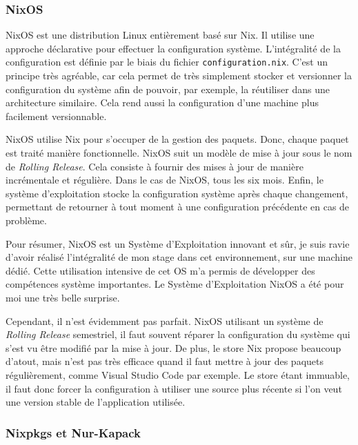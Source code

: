 \documentclass[a4paper,french,12pt, titlepage]{article}
\begin{document}
\hypertarget{nixos}{%
\subsubsection{NixOS}\label{nixos}}

NixOS est une distribution Linux entièrement basé sur Nix. Il utilise
une approche déclarative pour effectuer la configuration système.
L'intégralité de la configuration est définie par le biais du fichier
\texttt{configuration.nix}. C'est un principe très agréable, car cela
permet de très simplement stocker et versionner la configuration du
système afin de pouvoir, par exemple, la réutiliser dans une
architecture similaire. Cela rend aussi la configuration d'une machine
plus facilement versionnable.\newline

NixOS utilise Nix pour s'occuper de la gestion des paquets. Donc, chaque
paquet est traité manière fonctionnelle. NixOS suit un modèle de mise à
jour sous le nom de \emph{Rolling Release}. Cela consiste à fournir des
mises à jour de manière incrémentale et régulière. Dans le cas de NixOS,
tous les six mois. Enfin, le système d'exploitation stocke la
configuration système après chaque changement, permettant de retourner à
tout moment à une configuration précédente en cas de problème.\newline

Pour résumer, NixOS est un Système d'Exploitation innovant et sûr, je
suis ravie d'avoir réalisé l'intégralité de mon stage dans cet
environnement, sur une machine dédié. Cette utilisation intensive de cet
OS m'a permis de développer des compétences système importantes. Le
Système d'Exploitation NixOS a été pour moi une très belle
surprise.\newline

Cependant, il n'est évidemment pas parfait. NixOS utilisant un système
de \emph{Rolling Release} semestriel, il faut souvent réparer la
configuration du système qui s'est vu être modifié par la mise à jour.
De plus, le store Nix propose beaucoup d'atout, mais n'est pas très
efficace quand il faut mettre à jour des paquets régulièrement, comme
Visual Studio Code par exemple. Le store étant immuable, il faut donc
forcer la configuration à utiliser une source plus récente si l'on veut
une version stable de l'application utilisée.\newline

\hypertarget{nixpkgs-et-nur-kapack}{%
\subsubsection{Nixpkgs et Nur-Kapack}\label{nixpkgs-et-nur-kapack}}
\end{document}
